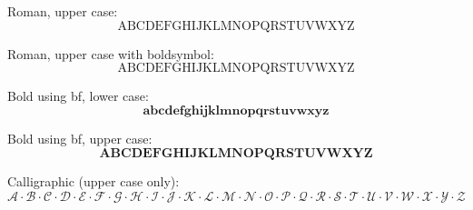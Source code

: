 \documentclass[12pt,a4paper]{article}
\theoremstyle{clearprint}
\begin{document}
\noindent 
Roman, upper case:
\begin{equation}
\mathrm{A}  \mathrm{B}  \mathrm{C}  \mathrm{D}  \mathrm{E}  \mathrm{F}  \mathrm{G}  \mathrm{H}  \mathrm{I}  \mathrm{J}  \mathrm{K}  \mathrm{L}  \mathrm{M}  \mathrm{N}  \mathrm{O}  \mathrm{P}  \mathrm{Q}  \mathrm{R}  \mathrm{S}  \mathrm{T}  \mathrm{U}  \mathrm{V}  \mathrm{W}  \mathrm{X}  \mathrm{Y}  \mathrm{Z}
\end{equation}

\noindent 
Roman, upper case with boldsymbol:
\begin{equation}
\boldsymbol{\mathrm{A}  \mathrm{B}  \mathrm{C}  \mathrm{D}  \mathrm{E}  \mathrm{F}  \mathrm{G}  \mathrm{H}  \mathrm{I}  \mathrm{J}  \mathrm{K}  \mathrm{L}  \mathrm{M}  \mathrm{N}  \mathrm{O}  \mathrm{P}  \mathrm{Q}  \mathrm{R}  \mathrm{S}  \mathrm{T}  \mathrm{U}  \mathrm{V}  \mathrm{W}  \mathrm{X}  \mathrm{Y}  \mathrm{Z}}
\end{equation}

\noindent 
Bold using bf, lower case:
\begin{equation}
\mathbf{a}  \mathbf{b}  \mathbf{c}  \mathbf{d}  \mathbf{e}  \mathbf{f}  \mathbf{g}  \mathbf{h}  \mathbf{i}  \mathbf{j}  \mathbf{k}  \mathbf{l}  \mathbf{m}  \mathbf{n}  \mathbf{o}  \mathbf{p}  \mathbf{q}  \mathbf{r}  \mathbf{s}  \mathbf{t}  \mathbf{u}  \mathbf{v}  \mathbf{w}  \mathbf{x}  \mathbf{y}  \mathbf{z}
\end{equation}

\noindent 
Bold using bf, upper case:
\begin{equation}
\mathbf{A}  \mathbf{B}  \mathbf{C}  \mathbf{D}  \mathbf{E}  \mathbf{F}  \mathbf{G}  \mathbf{H}  \mathbf{I}  \mathbf{J}  \mathbf{K}  \mathbf{L}  \mathbf{M}  \mathbf{N}  \mathbf{O}  \mathbf{P}  \mathbf{Q}  \mathbf{R}  \mathbf{S}  \mathbf{T}  \mathbf{U}  \mathbf{V}  \mathbf{W}  \mathbf{X}  \mathbf{Y}  \mathbf{Z}
\end{equation}

\noindent 
Calligraphic (upper case only):
\begin{equation}
\mathcal{A} \cdot \mathcal{B} \cdot \mathcal{C} \cdot \mathcal{D} \cdot \mathcal{E} \cdot \mathcal{F} \cdot \mathcal{G} \cdot \mathcal{H} \cdot \mathcal{I} \cdot \mathcal{J} \cdot \mathcal{K} \cdot \mathcal{L} \cdot \mathcal{M} \cdot \mathcal{N} \cdot \mathcal{O} \cdot \mathcal{P} \cdot \mathcal{Q} \cdot \mathcal{R} \cdot \mathcal{S} \cdot \mathcal{T} \cdot \mathcal{U} \cdot \mathcal{V} \cdot \mathcal{W} \cdot \mathcal{X} \cdot \mathcal{Y} \cdot \mathcal{Z}
\end{equation}
\end{document}
